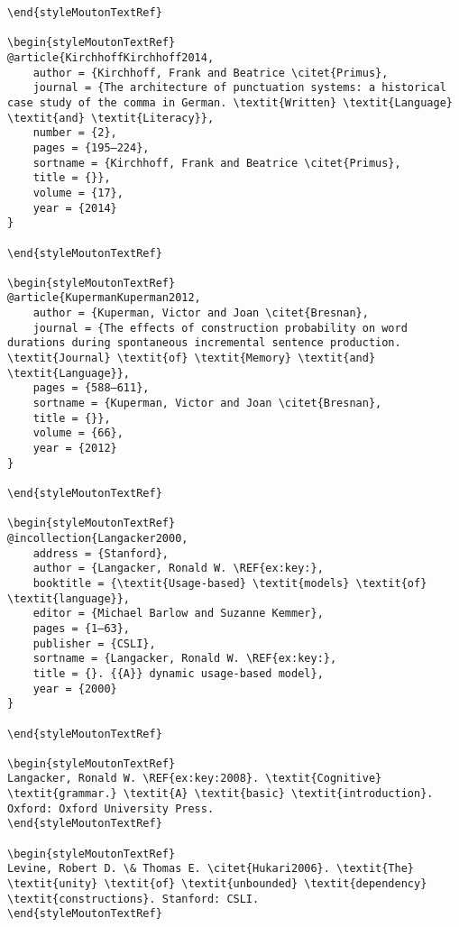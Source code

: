 \begin{styleMoutonHeadingRef}
\begin{verbatim}
\end{styleMoutonTextRef}

\begin{styleMoutonTextRef}
@article{KirchhoffKirchhoff2014,
	author = {Kirchhoff, Frank and Beatrice \citet{Primus},
	journal = {The architecture of punctuation systems: a historical case study of the comma in German. \textit{Written} \textit{Language} \textit{and} \textit{Literacy}},
	number = {2},
	pages = {195–224},
	sortname = {Kirchhoff, Frank and Beatrice \citet{Primus},
	title = {}},
	volume = {17},
	year = {2014}
}

\end{styleMoutonTextRef}

\begin{styleMoutonTextRef}
@article{KupermanKuperman2012,
	author = {Kuperman, Victor and Joan \citet{Bresnan},
	journal = {The effects of construction probability on word durations during spontaneous incremental sentence production. \textit{Journal} \textit{of} \textit{Memory} \textit{and} \textit{Language}},
	pages = {588–611},
	sortname = {Kuperman, Victor and Joan \citet{Bresnan},
	title = {}},
	volume = {66},
	year = {2012}
}

\end{styleMoutonTextRef}

\begin{styleMoutonTextRef}
@incollection{Langacker2000,
	address = {Stanford},
	author = {Langacker, Ronald W. \REF{ex:key:},
	booktitle = {\textit{Usage-based} \textit{models} \textit{of} \textit{language}},
	editor = {Michael Barlow and Suzanne Kemmer},
	pages = {1–63},
	publisher = {CSLI},
	sortname = {Langacker, Ronald W. \REF{ex:key:},
	title = {}. {{A}} dynamic usage-based model},
	year = {2000}
}

\end{styleMoutonTextRef}

\begin{styleMoutonTextRef}
Langacker, Ronald W. \REF{ex:key:2008}. \textit{Cognitive} \textit{grammar.} \textit{A} \textit{basic} \textit{introduction}. Oxford: Oxford University Press.
\end{styleMoutonTextRef}

\begin{styleMoutonTextRef}
Levine, Robert D. \& Thomas E. \citet{Hukari2006}. \textit{The} \textit{unity} \textit{of} \textit{unbounded} \textit{dependency} \textit{constructions}. Stanford: CSLI.
\end{styleMoutonTextRef}


\end{verbatim}
\end{styleMoutonHeadingRef}
